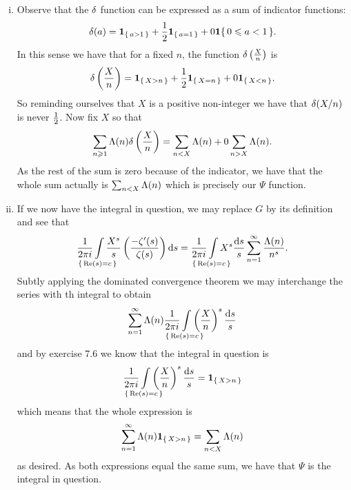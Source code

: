 \documentclass[12pt]{memoir}
\begin{document}
\begin{ptcbr}
\begin{enumerate}[i)]
    \item Observe that the $\delta$ function can be expressed as a sum of indicator functions:
    $$\dl(a)=\ind_{\set{a>1}}+\half\ind_{\set{a=1}}+0\ind{\set{0\leq a<1}}.$$
    In this sense we have that for a fixed $n$, the function $\delta\left(\frac{X}{n}\right)$ is 
    $$\dl\left(\frac{X}{n}\right)=\ind_{\set{X>n}}+\half\ind_{\set{X=n}}+0\ind_{\set{X<n}}.$$
    So reminding ourselves that $X$ is a positive non-integer we have that $\delta(X/n)$ is never $\half$. Now fix $X$ so that 
    $$\sum_{n\geqslant 1}\Lambda(n)\delta\left(\frac{X}{n}\right)=\sum_{n<X}\Lambda(n)+0\sum_{n>X}\Lambda(n).$$
    As the rest of the sum is zero because of the indicator, we have that the whole sum actually is $\sum_{n<X}\Lambda(n)$ which is precisely our $\Psi$ function.
    \item If we now have the integral in question, we may replace $G$ by its definition and see that 
    $$\frac{1}{2\pi i}\hspace*{-1.5em}\int\limits_{\set{\Re(s)=c}}\hspace*{-1.5em}\frac{X^s}{s}\left(\frac{-\zeta'(s)}{\zeta(s)}\right)\dd s=\frac{1}{2\pi i}\hspace*{-1.5em}\int\limits_{\set{\Re(s)=c}}\hspace*{-1.5em}X^s\frac{\dd s}{s}\sum_{n=1}^\infty\frac{\La(n)}{n^s}.$$
    Subtly applying the dominated convergence theorem we may interchange the series with th integral to obtain 
    $$\sum_{n=1}^\infty\La(n)\frac{1}{2\pi i}\hspace*{-1.5em}\int\limits_{\set{\Re(s)=c}}\hspace*{-1.5em}\left(\frac{X}{n}\right)^s\frac{\dd s}{s}$$
    and by exercise $7.6$ we know that the integral in question is 
    $$\frac{1}{2\pi i}\hspace*{-1.5em}\int\limits_{\set{\Re(s)=c}}\hspace*{-1.5em}\left(\frac{X}{n}\right)^s\frac{\dd s}{s}=\ind_{\set{X>n}}$$
    which means that the whole expression is 
    $$\sum_{n=1}^\infty\Lambda(n)\mathbf{1}_{\{\,X>n\,\}}=\sum_{n<X}\Lambda(n)$$
    as desired. As both expressions equal the same sum, we have that $\Psi$ is the integral in question.
\end{enumerate}
\end{ptcbr}
\end{document}
